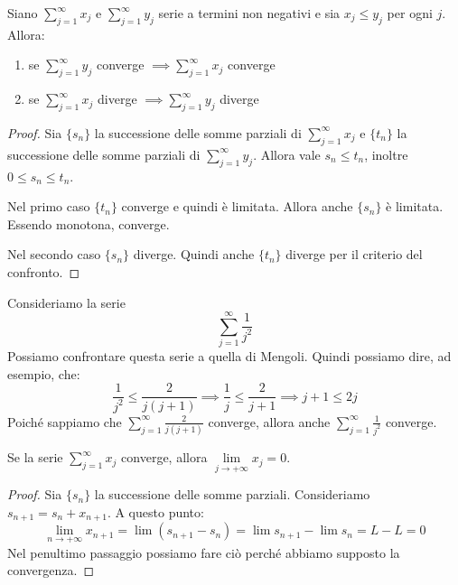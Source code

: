\begin{proposition}
Siano $\sum_{j=1}^\infty x_j$ e $\sum_{j=1}^\infty y_j$ serie a termini non negativi e sia $x_j \le y_j$ per ogni $j$. Allora:
\begin{enumerate}
\item se $\sum_{j=1}^\infty y_j$ converge $\implies \sum_{j=1}^\infty x_j$ converge
\item se $\sum_{j=1}^\infty x_j$ diverge $\implies \sum_{j=1}^\infty y_j$ diverge
\end{enumerate}
\end{proposition}

\begin{proof}
Sia $\{s_n\}$ la successione delle somme parziali di $\sum_{j=1}^\infty x_j$ e $\{t_n\}$ la successione delle somme parziali di $\sum_{j=1}^\infty y_j$. Allora vale $s_n \le t_n$, inoltre $0 \le s_n \le t_n$.

Nel primo caso $\{t_n\}$ converge e quindi è limitata. Allora anche $\{s_n\}$ è limitata. Essendo monotona, converge.

Nel secondo caso $\{s_n\}$ diverge. Quindi anche $\{t_n\}$ diverge per il criterio del confronto.
\end{proof}

\begin{example}
Consideriamo la serie 
\begin{equation*}
\sum_{j=1}^\infty \frac{1}{j^2}
\end{equation*}
Possiamo confrontare questa serie a quella di Mengoli. Quindi possiamo dire, ad esempio, che:
\begin{equation*}
\frac{1}{j^2} \le \frac{2}{j(j+1)} \implies \frac{1}{j} \le \frac{2}{j+1} \implies j+1 \le 2j
\end{equation*}
Poiché sappiamo che $\sum_{j=1}^\infty \frac{2}{j(j+1)}$ converge, allora anche $\sum_{j=1}^\infty \frac{1}{j^2}$ converge.
\end{example}

\begin{proposition}
Se la serie $\sum_{j=1}^\infty x_j$ converge, allora $\lim\limits_{j \to +\infty} x_j = 0$.
\end{proposition}

\begin{proof}
Sia $\{s_n\}$ la successione delle somme parziali. Consideriamo $s_{n+1} = s_n + x_{n+1}$. A questo punto:
\begin{equation*}
\lim_{n \to +\infty} x_{n+1} = \lim (s_{n+1} - s_n) = \lim s_{n+1} - \lim s_n = L - L = 0
\end{equation*}
Nel penultimo passaggio possiamo fare ciò perché abbiamo supposto la convergenza.
\end{proof}


